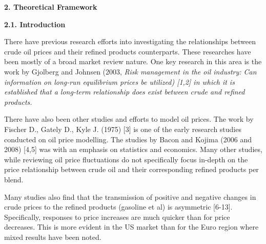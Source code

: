 \documentclass[12pt,twoside]{article}
\begin{document}
\vspace{\baselineskip}\begin{justify}
{\fontsize{13pt}{15.6pt}\selectfont \textbf{2. Theoretical Framework}\par}
\end{justify}\par

\begin{justify}
{\fontsize{11pt}{13.2pt}\selectfont \textbf{2.1. Introduction}\par}
\end{justify}\par

\begin{justify}
{\fontsize{11pt}{13.2pt}\selectfont There have previous research efforts into investigating the relationships between crude oil prices and their refined products counterparts. These researches have been mostly of a broad market review nature. One key research in this area is the work by Gjolberg and Johnsen (2003, \textit{Risk management in the oil industry: Can information on long-run equilibrium prices be utilized) \textcolor[HTML]{FF0000}{[1,2] in which it is established that a long-term relationship does exist between crude and refined products.}}\par}
\end{justify}\par

\begin{justify}
{\fontsize{11pt}{13.2pt}\selectfont There have also been other studies and efforts to model oil prices. The work by Fischer D., Gately D., Kyle J. (1975) \textcolor[HTML]{FF0000}{[3] is one of the early research studies conducted on oil price modelling.  The studies by Bacon and Kojima (2006 and 2008) [4,5] was with an emphasis on statistics and economics. Many other studies, while reviewing oil price fluctuations do not specifically focus in-depth on the price relationship between crude oil and their corresponding refined products per blend.}\par}
\end{justify}\par

\begin{justify}
{\fontsize{11pt}{13.2pt}\selectfont Many studies also find that the transmission of positive and negative changes in crude prices to the refined products (gasoline et al) is asymmetric \textcolor[HTML]{FF0000}{[6-13]. Specifically, responses to price increases are much quicker than for price decreases. This is more evident in the US market than for the Euro region where mixed results have been noted.}\par}
\end{justify}\par
\end{document}
